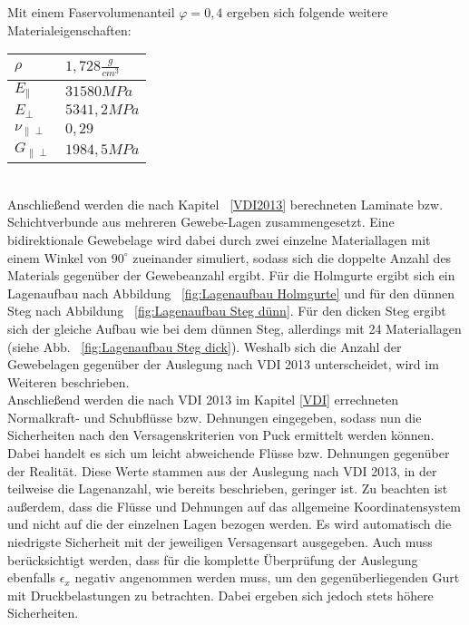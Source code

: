 \noindent Mit einem Faservolumenanteil $\varphi=0,4$ ergeben sich folgende weitere Materialeigenschaften:\\

\begin{tabular}{ll}
	$\rho$ & $1,728 \frac{g}{cm^{3}}$ \\
	\hline
	$E_{\parallel}$ & $31580 MPa$\\
	\hline
	$E_{\perp}$ & $5341,2MPa$\\
	\hline
	$\nu_{\parallel\perp}$ & $0,29$\\
	\hline
	$G_{\parallel\perp}$ & $1984,5 MPa$\\
\end{tabular}\\

\noindent Anschließend werden die nach Kapitel ~\ref{VDI2013} berechneten Laminate bzw. Schichtverbunde aus mehreren Gewebe-Lagen zusammengesetzt. Eine bidirektionale Gewebelage wird dabei durch zwei einzelne Materiallagen mit einem Winkel von $90^{\circ}$ zueinander simuliert, sodass sich die doppelte Anzahl des Materials gegenüber der Gewebeanzahl ergibt. Für die Holmgurte ergibt sich ein Lagenaufbau nach Abbildung ~\ref{fig:Lagenaufbau Holmgurte} und für den dünnen Steg nach Abbildung ~\ref{fig:Lagenaufbau Steg dünn}. Für den dicken Steg ergibt sich der gleiche Aufbau wie bei dem dünnen Steg, allerdings mit 24 Materiallagen (siehe Abb. ~\ref{fig:Lagenaufbau Steg dick}). Weshalb sich die Anzahl der Gewebelagen gegenüber der Auslegung nach VDI 2013 unterscheidet, wird im Weiteren beschrieben.\\ 

\noindent Anschließend werden die nach VDI 2013 im Kapitel \ref{VDI} errechneten Normalkraft- und Schubflüsse bzw. Dehnungen eingegeben, sodass nun die Sicherheiten nach den Versagenskriterien von Puck ermittelt werden können. Dabei handelt es sich um leicht abweichende Flüsse bzw. Dehnungen gegenüber der Realität. Diese Werte stammen aus der Auslegung nach VDI 2013, in der teilweise die Lagenanzahl, wie bereits beschrieben, geringer ist. Zu beachten ist außerdem, dass die Flüsse und Dehnungen auf das allgemeine Koordinatensystem und nicht auf die der einzelnen Lagen bezogen werden. Es wird automatisch die niedrigste Sicherheit mit der jeweiligen Versagensart ausgegeben. Auch muss berücksichtigt werden, dass für die komplette Überprüfung der Auslegung ebenfalls $\epsilon_{x}$ negativ angenommen werden muss, um den gegenüberliegenden Gurt mit Druckbelastungen zu betrachten. Dabei ergeben sich jedoch stets höhere Sicherheiten.\\

